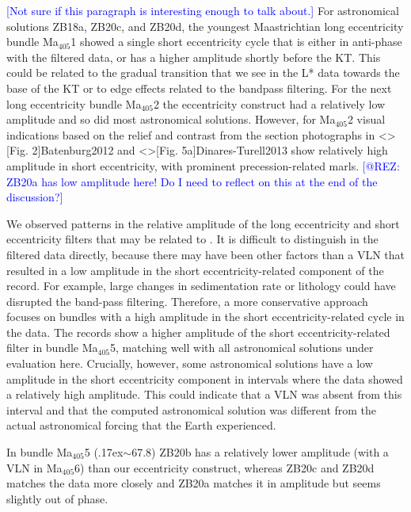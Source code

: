 \documentclass[draft]{agujournal2019}
\newcommand{\appr}{\raise.17ex\hbox{\(\scriptstyle\sim\)}} %
\newcommand{\ma}[1]{Ma\(_{405}\)#1} %
\newcommand{\ijk}{\textcolor{blue}}
\begin{document}
\ijk{[Not sure if this paragraph is interesting enough to talk about.]}
For astronomical solutions ZB18a, ZB20c, and ZB20d, the youngest Maastrichtian long eccentricity bundle \ma{1} showed a single short eccentricity cycle that is either in anti-phase with the filtered data, or has a higher amplitude shortly before the \gls{KT}.
This could be related to the gradual transition that we see in the \gls{L*} data towards the base of the \gls{KT} or to edge effects related to the bandpass filtering.
For the next long eccentricity bundle \ma{2} the eccentricity construct had a relatively low amplitude and so did most astronomical solutions.
However, for \ma{2} visual indications based on the relief and contrast from the section photographs in \citeA<>[Fig. 2]{Batenburg2012} and \citeA<>[Fig. 5a]{Dinares-Turell2013} show relatively high amplitude in short eccentricity, with prominent precession-related marls.
\ijk{[@REZ: ZB20a has low amplitude here! Do I need to reflect on this at the end of the discussion?]}

We observed patterns in the relative amplitude of the long eccentricity and short eccentricity filters that may be related to .
It is difficult to distinguish  in the filtered data directly, because there may have been other factors than a \gls{VLN} that resulted in a low amplitude in the short eccentricity-related component of the record.
For example, large changes in sedimentation rate or lithology could have disrupted the band-pass filtering.
Therefore, a more conservative approach focuses on bundles with a high amplitude in the short eccentricity-related cycle in the data.
The records show a higher amplitude of the short eccentricity-related filter in bundle \ma{5}, matching well with all astronomical solutions under evaluation here.
Crucially, however, some astronomical solutions have a low amplitude in the short eccentricity component in intervals where the data showed a relatively high amplitude.
This could indicate that a \gls{VLN} was absent from this interval and that the computed astronomical solution was different from the actual astronomical forcing that the Earth experienced.

In bundle \ma{5} (\appr\qty{67.8}{\millionyearago}) ZB20b has a relatively lower amplitude (with a \gls{VLN} in \ma{6}) than our eccentricity construct, whereas ZB20c and ZB20d matches the data more closely and ZB20a matches it in amplitude but seems slightly out of phase.
\end{document}

